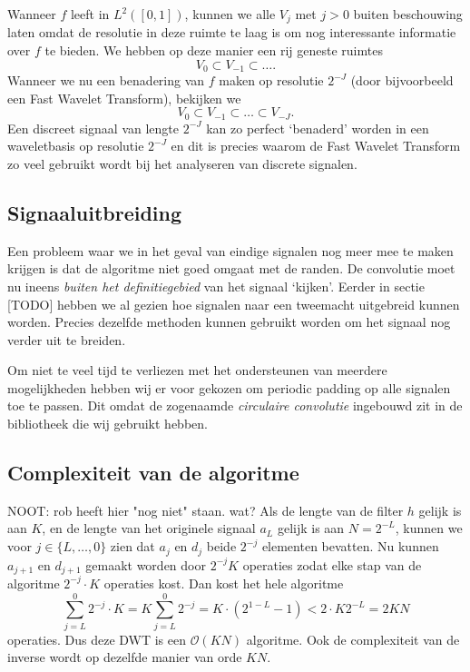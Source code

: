\documentclass[11pt]{report}
\theoremstyle{plain}
\theoremstyle{remark}
\begin{document}
Wanneer $f$ leeft in $L^2([0,1])$, kunnen we alle $V_j$ met $j > 0$ buiten beschouwing laten omdat de resolutie in deze ruimte te laag is om nog interessante informatie over $f$ te bieden. We hebben op deze manier een rij geneste ruimtes
\[
V_0 \subset V_{-1} \subset \ldots.
\]
Wanneer we nu een benadering van $f$ maken op resolutie $2^{-J}$ (door bijvoorbeeld een Fast Wavelet Transform), bekijken we
\[
	V_0 \subset V_{-1} \subset \ldots \subset V_{-J}.
\]
Een discreet signaal van lengte $2^{-J}$ kan zo perfect `benaderd' worden in een waveletbasis op resolutie $2^{-J}$ en dit is precies waarom de Fast Wavelet Transform zo veel gebruikt wordt bij het analyseren van discrete signalen.

\subsection{Signaaluitbreiding}
Een probleem waar we in het geval van eindige signalen nog meer mee te maken krijgen is dat de algoritme niet goed omgaat met de randen. De convolutie moet nu ineens \emph{buiten het definitiegebied} van het signaal `kijken'. Eerder in sectie [TODO] hebben we al gezien hoe signalen naar een tweemacht uitgebreid kunnen worden. Precies dezelfde methoden kunnen gebruikt worden om het signaal nog verder uit te breiden. 

Om niet te veel tijd te verliezen met het ondersteunen van meerdere mogelijkheden hebben wij er voor gekozen om periodic padding op alle signalen toe te passen. Dit omdat de zogenaamde \emph{circulaire convolutie} ingebouwd zit in de bibliotheek die wij gebruikt hebben.

\subsection{Complexiteit van de algoritme}
NOOT: rob heeft hier "nog niet" staan. wat?
Als de lengte van de filter $h$ gelijk is aan $K$, en de lengte van het originele signaal $a_L$ gelijk is aan $N = 2^{-L}$, kunnen we voor $j \in \{L, \ldots, 0\}$ zien dat $a_j$ en $d_j$ beide $2^{-j}$ elementen bevatten. Nu kunnen $a_{j+1}$ en $d_{j+1}$ gemaakt worden door $2^{-j}K$ operaties zodat elke stap van de algoritme $2^{-j} \cdot K$ operaties kost. Dan kost het hele algoritme
\[
	\sum_{j=L}^0 2^{-j} \cdot K = K \sum_{j=L}^0 2^{-j} = K \cdot (2^{1-L} - 1) < 2 \cdot K 2^{-L} = 2KN
\]
operaties. Dus deze DWT is een $\mathcal{O}(KN)$ algoritme. Ook de complexiteit van de inverse wordt op dezelfde manier van orde $KN$. 
\end{document}
